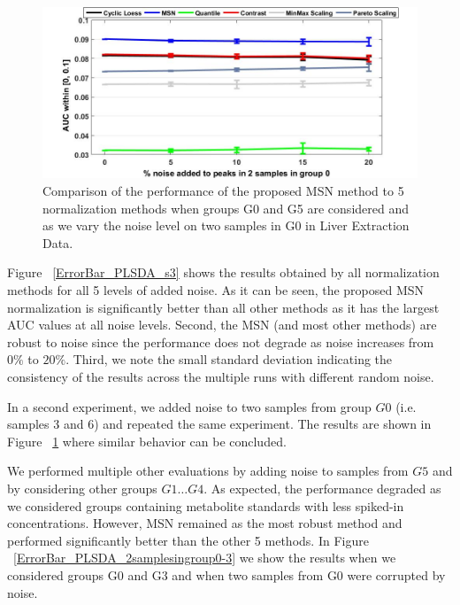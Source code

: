 \begin{figure}
	
	\centering
	\includegraphics[width=1\textwidth]{ErrorBar_PLSDA_2samples}
	\caption{Comparison of the performance of the proposed MSN method to 5 normalization methods when groups G0 and G5 are considered and as we vary the noise level on two samples in G0 in Liver Extraction Data.}
	\label{ErrorBar_PLSDA_2samples}
\end{figure}

Figure ~\ref{ErrorBar_PLSDA_s3} shows the results obtained by all normalization methods for all 5 levels of added noise. As it can be seen, the proposed MSN normalization is significantly better than all other methods as it has the largest AUC values at all noise levels. Second, the MSN (and most other methods) are robust to noise since the performance does not degrade as noise increases from $0\%$ to $20\%$. Third, we note the small standard deviation indicating the consistency of the results across the multiple runs with different random noise. 

In a second experiment, we added noise to two samples from group $G0$ (i.e. samples 3 and 6) and repeated the same experiment. The results are shown in Figure ~\ref{ErrorBar_PLSDA_2samples} where similar behavior can be concluded. 

We performed multiple other evaluations by adding noise to samples from $G5$ and by considering other groups $G1 \ldots G4$. As expected, the performance degraded as we considered groups containing metabolite standards with less spiked-in concentrations. However, MSN remained as the most robust method and performed significantly better than the other 5 methods. In Figure ~\ref{ErrorBar_PLSDA_2samplesingroup0-3} we show the results when we considered groups G0 and G3 and when two samples from G0 were corrupted by noise. 

